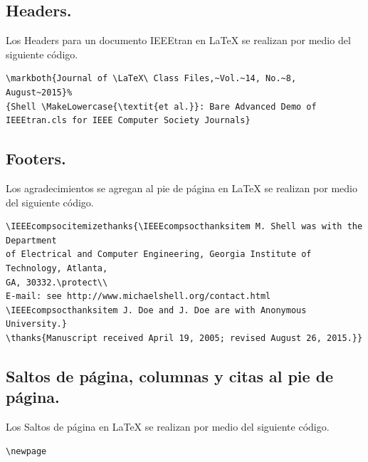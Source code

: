 \documentclass[10pt,journal,compsoc]{IEEEtran}
\begin{document}
\subsection{Headers.}
Los Headers  para un documento IEEEtran en {\LaTeX} se realizan por medio del siguiente c\'odigo.
\begin{lstlisting}
\markboth{Journal of \LaTeX\ Class Files,~Vol.~14, No.~8, August~2015}%
{Shell \MakeLowercase{\textit{et al.}}: Bare Advanced Demo of IEEEtran.cls for IEEE Computer Society Journals}
\end{lstlisting}

\subsection{Footers.}
Los agradecimientos se agregan al pie de p\'agina en {\LaTeX} se realizan por medio del siguiente c\'odigo.
\begin{lstlisting}
\IEEEcompsocitemizethanks{\IEEEcompsocthanksitem M. Shell was with the Department
of Electrical and Computer Engineering, Georgia Institute of Technology, Atlanta,
GA, 30332.\protect\\
E-mail: see http://www.michaelshell.org/contact.html
\IEEEcompsocthanksitem J. Doe and J. Doe are with Anonymous University.}
\thanks{Manuscript received April 19, 2005; revised August 26, 2015.}}
\end{lstlisting}

\subsection{Saltos de p\'agina, columnas y citas al pie de p\'agina.}
Los Saltos de p\'agina  en {\LaTeX} se realizan por medio del siguiente c\'odigo.

\begin{lstlisting}
\newpage
\end{lstlisting}
\end{document}
